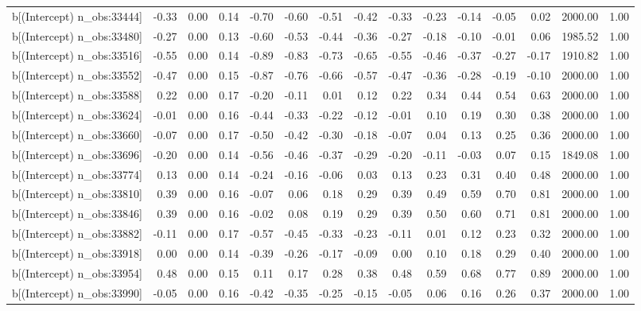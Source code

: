 \begin{table}[ht]
\begin{tabular}{rrrrrrrrrrrrrrr}
  b[(Intercept) n\_obs:33444] & -0.33 & 0.00 & 0.14 & -0.70 & -0.60 & -0.51 & -0.42 & -0.33 & -0.23 & -0.14 & -0.05 & 0.02 & 2000.00 & 1.00 \\ 
  b[(Intercept) n\_obs:33480] & -0.27 & 0.00 & 0.13 & -0.60 & -0.53 & -0.44 & -0.36 & -0.27 & -0.18 & -0.10 & -0.01 & 0.06 & 1985.52 & 1.00 \\ 
  b[(Intercept) n\_obs:33516] & -0.55 & 0.00 & 0.14 & -0.89 & -0.83 & -0.73 & -0.65 & -0.55 & -0.46 & -0.37 & -0.27 & -0.17 & 1910.82 & 1.00 \\ 
  b[(Intercept) n\_obs:33552] & -0.47 & 0.00 & 0.15 & -0.87 & -0.76 & -0.66 & -0.57 & -0.47 & -0.36 & -0.28 & -0.19 & -0.10 & 2000.00 & 1.00 \\ 
  b[(Intercept) n\_obs:33588] & 0.22 & 0.00 & 0.17 & -0.20 & -0.11 & 0.01 & 0.12 & 0.22 & 0.34 & 0.44 & 0.54 & 0.63 & 2000.00 & 1.00 \\ 
  b[(Intercept) n\_obs:33624] & -0.01 & 0.00 & 0.16 & -0.44 & -0.33 & -0.22 & -0.12 & -0.01 & 0.10 & 0.19 & 0.30 & 0.38 & 2000.00 & 1.00 \\ 
  b[(Intercept) n\_obs:33660] & -0.07 & 0.00 & 0.17 & -0.50 & -0.42 & -0.30 & -0.18 & -0.07 & 0.04 & 0.13 & 0.25 & 0.36 & 2000.00 & 1.00 \\ 
  b[(Intercept) n\_obs:33696] & -0.20 & 0.00 & 0.14 & -0.56 & -0.46 & -0.37 & -0.29 & -0.20 & -0.11 & -0.03 & 0.07 & 0.15 & 1849.08 & 1.00 \\ 
  b[(Intercept) n\_obs:33774] & 0.13 & 0.00 & 0.14 & -0.24 & -0.16 & -0.06 & 0.03 & 0.13 & 0.23 & 0.31 & 0.40 & 0.48 & 2000.00 & 1.00 \\ 
  b[(Intercept) n\_obs:33810] & 0.39 & 0.00 & 0.16 & -0.07 & 0.06 & 0.18 & 0.29 & 0.39 & 0.49 & 0.59 & 0.70 & 0.81 & 2000.00 & 1.00 \\ 
  b[(Intercept) n\_obs:33846] & 0.39 & 0.00 & 0.16 & -0.02 & 0.08 & 0.19 & 0.29 & 0.39 & 0.50 & 0.60 & 0.71 & 0.81 & 2000.00 & 1.00 \\ 
  b[(Intercept) n\_obs:33882] & -0.11 & 0.00 & 0.17 & -0.57 & -0.45 & -0.33 & -0.23 & -0.11 & 0.01 & 0.12 & 0.23 & 0.32 & 2000.00 & 1.00 \\ 
  b[(Intercept) n\_obs:33918] & 0.00 & 0.00 & 0.14 & -0.39 & -0.26 & -0.17 & -0.09 & 0.00 & 0.10 & 0.18 & 0.29 & 0.40 & 2000.00 & 1.00 \\ 
  b[(Intercept) n\_obs:33954] & 0.48 & 0.00 & 0.15 & 0.11 & 0.17 & 0.28 & 0.38 & 0.48 & 0.59 & 0.68 & 0.77 & 0.89 & 2000.00 & 1.00 \\ 
  b[(Intercept) n\_obs:33990] & -0.05 & 0.00 & 0.16 & -0.42 & -0.35 & -0.25 & -0.15 & -0.05 & 0.06 & 0.16 & 0.26 & 0.37 & 2000.00 & 1.00 \\ 

\end{tabular}
\end{table}

